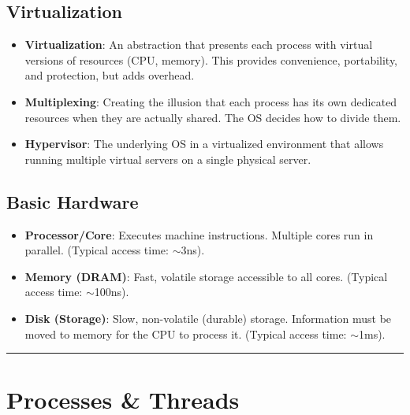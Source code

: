 \documentclass[8pt,a4paper]{article}
\newcommand{\sectiondivider}{\vspace{4pt}\hrule\vspace{4pt}}
\begin{document}
\begin{multicols}{2}
\subsection*{Virtualization}
\begin{itemize}
    \item \textbf{Virtualization}: An abstraction that presents each process with virtual versions of resources (CPU, memory). This provides convenience, portability, and protection, but adds overhead.
    \item \textbf{Multiplexing}: Creating the illusion that each process has its own dedicated resources when they are actually shared. The OS decides how to divide them.
    \item \textbf{Hypervisor}: The underlying OS in a virtualized environment that allows running multiple virtual servers on a single physical server.
\end{itemize}

\subsection*{Basic Hardware}
\begin{itemize}
    \item \textbf{Processor/Core}: Executes machine instructions. Multiple cores run in parallel. (Typical access time: $\sim$3ns).
    \item \textbf{Memory (DRAM)}: Fast, volatile storage accessible to all cores. (Typical access time: $\sim$100ns).
    \item \textbf{Disk (Storage)}: Slow, non-volatile (durable) storage. Information must be moved to memory for the CPU to process it. (Typical access time: $\sim$1ms).
\end{itemize}

\sectiondivider
\section*{Processes \& Threads}

\end{multicols}
\end{document}
